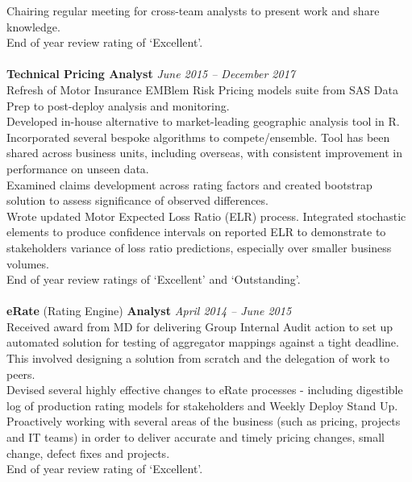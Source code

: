 \documentclass[11pt]{article}
\begin{document}
\begin{description}
\textbullet \quad Chairing regular meeting for cross-team analysts to present work and share knowledge. \\
\textbullet \quad End of year review rating of `Excellent'.
\\\\
\textbf{Technical Pricing Analyst} \emph{June 2015 -- December 2017}\\
\textbullet \quad Refresh of Motor Insurance EMBlem Risk Pricing models suite from SAS Data Prep to post-deploy analysis and monitoring. \\
\textbullet \quad Developed in-house alternative to market-leading geographic analysis tool in R. Incorporated several bespoke algorithms to compete/ensemble. Tool has been shared across business units, including overseas, with consistent improvement in performance on unseen data. \\
\textbullet \quad Examined claims development across rating factors and created bootstrap solution to assess significance of observed differences. \\
\textbullet \quad Wrote updated Motor Expected Loss Ratio (ELR) process. Integrated stochastic elements to produce confidence intervals on reported ELR to demonstrate to stakeholders variance of loss ratio predictions, especially over smaller business volumes. \\
\textbullet \quad End of year review ratings of `Excellent' and `Outstanding'.
\\\\
\newpage
\textbf{eRate} (Rating Engine) \textbf{Analyst} \emph{April 2014 -- June 2015}\\
\textbullet \quad Received award from MD for delivering Group Internal Audit action to set up automated solution for testing of aggregator mappings against a tight deadline. This involved designing a solution from scratch and the delegation of work to peers.\\
\textbullet \quad Devised several highly effective changes to eRate processes - including digestible log of production rating models for stakeholders and Weekly Deploy Stand Up. \\
\textbullet \quad Proactively working with several areas of the business (such as pricing, projects and IT teams) in order to deliver accurate and timely pricing changes, small change, defect fixes and projects.\\
\textbullet \quad End of year review rating of `Excellent'.
\end{description}
\end{document}
